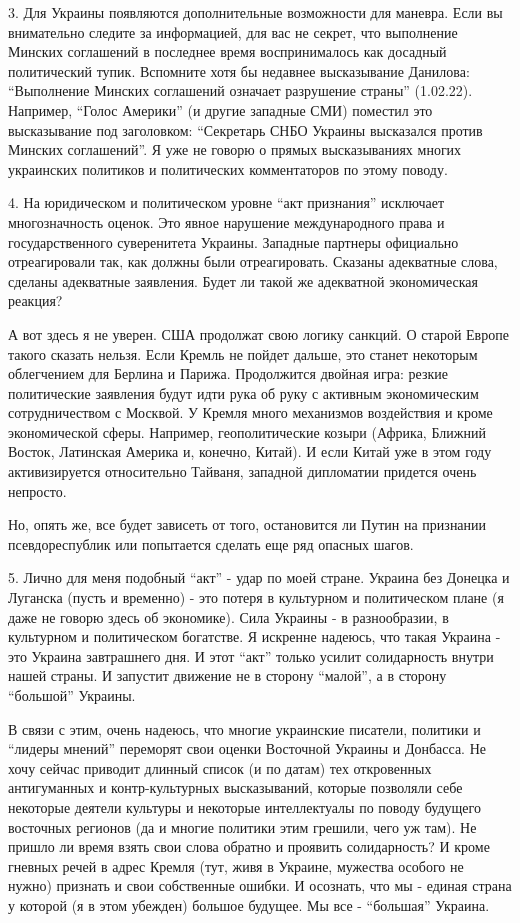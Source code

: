 3. Для Украины появляются дополнительные возможности для маневра. Если вы
внимательно следите за информацией, для вас не секрет, что выполнение Минских
соглашений в последнее время воспринималось как досадный политический тупик.
Вспомните хотя бы недавнее высказывание Данилова: \enquote{Выполнение Минских
соглашений означает разрушение страны} (1.02.22). Например, \enquote{Голос Америки} (и
другие западные СМИ) поместил это высказывание под заголовком: \enquote{Секретарь СНБО
Украины высказался против Минских соглашений}. Я уже не говорю о прямых
высказываниях многих украинских политиков и политических комментаторов по этому
поводу. 

4. На юридическом и политическом уровне \enquote{акт признания} исключает
многозначность оценок. Это явное нарушение международного права и
государственного суверенитета Украины. Западные партнеры официально
отреагировали так, как должны были отреагировать. Сказаны адекватные слова,
сделаны адекватные заявления. Будет ли такой же адекватной экономическая
реакция? 

А вот здесь я не уверен. США продолжат свою логику санкций. О старой Европе
такого сказать нельзя. Если Кремль не пойдет дальше, это станет некоторым
облегчением для Берлина и Парижа. Продолжится двойная игра: резкие политические
заявления будут идти рука об руку с активным экономическим сотрудничеством с
Москвой. У Кремля много механизмов воздействия и кроме экономической сферы.
Например, геополитические козыри (Африка, Ближний Восток, Латинская Америка и,
конечно, Китай). И если Китай уже в этом году активизируется относительно
Тайваня, западной дипломатии придется очень непросто. 

Но, опять же, все будет зависеть от того, остановится ли Путин на признании
псевдореспублик или попытается сделать еще ряд опасных шагов. 

5. Лично для меня подобный \enquote{акт} - удар по моей стране. Украина без Донецка и
Луганска (пусть и временно) - это потеря в культурном и политическом плане (я
даже не говорю здесь об экономике). Сила Украины - в разнообразии, в культурном
и политическом богатстве. Я искренне надеюсь, что такая Украина - это Украина
завтрашнего дня. И этот \enquote{акт} только усилит солидарность внутри нашей страны. И
запустит движение не в сторону \enquote{малой}, а в сторону \enquote{большой} Украины. 

В связи с этим, очень надеюсь, что многие украинские писатели, политики и
\enquote{лидеры мнений} переморят свои оценки Восточной Украины и Донбасса. Не хочу
сейчас приводит длинный список (и по датам) тех откровенных антигуманных и
контр-культурных высказываний, которые позволяли себе некоторые деятели
культуры и некоторые интеллектуалы по поводу будущего восточных регионов (да и
многие политики этим грешили, чего уж там). Не пришло ли время взять свои слова
обратно и проявить солидарность? И кроме гневных речей в адрес Кремля (тут,
живя в Украине, мужества особого не нужно) признать и свои собственные ошибки.
И осознать, что мы - единая страна у которой (я в этом убежден) большое
будущее. Мы все - \enquote{большая} Украина.
